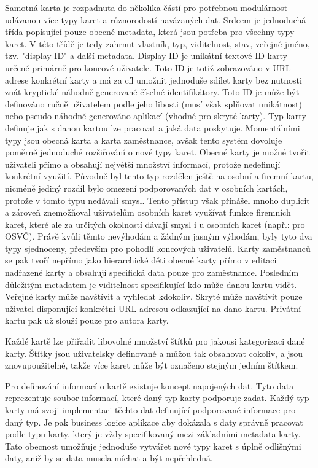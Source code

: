 \begin{itemize}
\begin{itemize}
		Samotná karta je rozpadnuta do několika částí pro potřebnou modulárnost udávanou více typy karet a různorodostí
		navázaných dat.
		Srdcem je jednoduchá třída popisující pouze obecné metadata, která jsou potřeba pro všechny typy karet.
		V této třídě je tedy zahrnut vlastník, typ, viditelnost, stav, veřejné jméno, tzv. "display ID" a další metadata.
		Display ID je unikátní textové ID karty určené primárně pro koncové uživatele.
		Toto ID je totiž zobrazováno v \ac{URL} adrese konkrétní karty a má za cíl umožnit jednoduše sdílet karty bez nutnosti
		znát kryptické náhodně generované číselné identifikátory.
		Toto ID je může být definováno ručně uživatelem podle jeho libosti (musí však splňovat unikátnost) nebo pseudo
		náhodně generováno aplikací (vhodné pro skryté karty).
		Typ karty definuje jak s danou kartou lze pracovat a jaká data poskytuje.
		Momentálními typy jsou obecná karta a karta zaměstnance, avšak tento systém dovoluje poměrně jednoduché rozšiřování
		o nové typy karet.
		Obecné karty je možné tvořit uživateli přímo a obsahují největší množství informací, protože nedefinují konkrétní
		využití.
		Původně byl tento typ rozdělen ještě na osobní a firemní kartu, nicméně jediný rozdíl bylo omezení podporovaných dat
		v osobních kartách, protože v tomto typu nedávali smysl.
		Tento přístup však přinášel mnoho duplicit a zároveň znemožňoval uživatelům osobních karet využívat funkce
		firemních karet, které ale za určitých okolností dávají smysl i u osobních karet (např.: pro OSVČ).
		Právě kvůli těmto nevýhodám a žádným jasným výhodám, byly tyto dva typy sjednoceny, především pro pohodlí
		koncových uživatelů.
		Karty zaměstnanců se pak tvoří nepřímo jako hierarchické děti obecné karty přímo v editaci nadřazené karty a
		obsahují specifická data pouze pro zaměstnance.
		Posledním důležitým metadatem je viditelnost specifikující kdo může danou kartu vidět.
		Veřejné karty může navštívit a vyhledat kdokoliv.
		Skryté může navštívit pouze uživatel disponující konkrétní \ac{URL} adresou odkazující na dano kartu.
		Privátní kartu pak už slouží pouze pro autora karty.

		Každé kartě lze přiřadit libovolné množství štítků pro jakousi kategorizaci dané karty.
		Štítky jsou uživatelsky definované a můžou tak obsahovat cokoliv, a jsou znovupoužitelné, takže více karet může
		být označeno stejným jedním štítkem.

		Pro definování informací o kartě existuje koncept napojených dat.
		Tyto data reprezentuje soubor informací, které daný typ karty podporuje zadat.
		Každý typ karty má svoji implementaci těchto dat definující podporované informace pro daný typ.
		Je pak business logice aplikace aby dokázala s daty správně pracovat podle typu karty, který je vždy specifikovaný mezi
		základními metadata karty.
		Tato obecnost umožňuje jednoduše vytvářet nové typy karet s úplně odlišnými daty, aniž by se data musela míchat
		a být nepřehledná.


\end{itemize}
\end{itemize}
